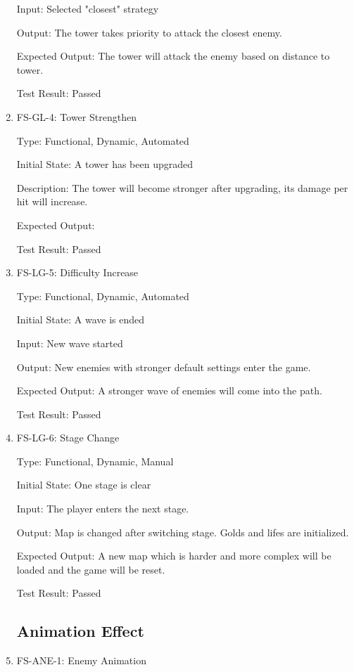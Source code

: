 \documentclass[12pt]{article}
\begin{document}
\begin{enumerate}
	Input: Selected "closest" strategy
					
	Output: The tower takes priority to attack the closest enemy.
					
	Expected Output: The tower will attack the enemy based on distance to tower.
	
	Test Result: Passed
	
	
	\item{FS-GL-4: Tower Strengthen}
	
	Type: Functional, Dynamic, Automated
	
	Initial State: A tower has been upgraded
	
	Description: The tower will become stronger after upgrading, its damage per hit will increase.
	
	Expected Output: 
	
	Test Result: Passed
	
	
	\item{FS-LG-5: Difficulty Increase}
	
	Type: Functional, Dynamic, Automated
	
	Initial State: A wave is ended
	
	Input: New wave started
	
	Output: New enemies with stronger default settings enter the game.
	
	Expected Output: A stronger wave of enemies will come into the path.
	
	Test Result: Passed
	

    \item{FS-LG-6: Stage Change}
	
	Type: Functional, Dynamic, Manual
	
	Initial State: One stage is clear
	
	Input: The player enters the next stage.
	
	Output: Map is changed after switching stage. Golds and lifes are initialized.
	
	Expected Output: A new map which is harder and more complex will be loaded and the game will be reset.
	
	Test Result: Passed

    
    
	\subsection{Animation Effect}
					
	
    
    \item{FS-ANE-1: Enemy Animation}
    

\end{enumerate}
\end{document}
